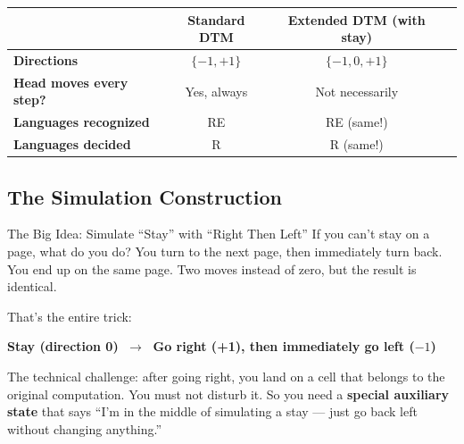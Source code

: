 
\begin{center}
\begin{tabular}{lccc}
\toprule
& \textbf{Standard DTM} & \textbf{Extended DTM (with stay)} \\
\midrule
\textbf{Directions} & $\{-1, +1\}$ & $\{-1, 0, +1\}$ \\
\textbf{Head moves every step?} & Yes, always & Not necessarily \\
\textbf{Languages recognized} & RE & RE (same!) \\
\textbf{Languages decided} & R & R (same!) \\
\bottomrule
\end{tabular}
\end{center}


\subsection{The Simulation Construction \kemark}

\begin{notebox}{The Big Idea: Simulate ``Stay'' with ``Right Then Left''}
If you can't stay on a page, what do you do? You turn to the next page, then immediately turn back. You end up on the same page. Two moves instead of zero, but the result is identical.

That's the entire trick:
\begin{center}
\textbf{Stay (direction 0)} $\;\longrightarrow\;$ \textbf{Go right (+1), then immediately go left ($-1$)}
\end{center}

The technical challenge: after going right, you land on a cell that belongs to the original computation. You must not disturb it. So you need a \textbf{special auxiliary state} that says ``I'm in the middle of simulating a stay --- just go back left without changing anything.''
\end{notebox}


